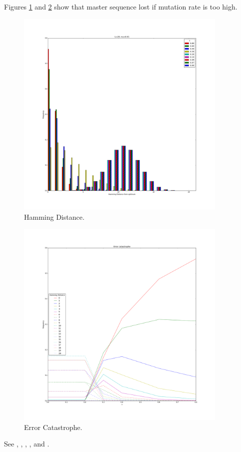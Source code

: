 \documentclass[]{article}
\begin{document}
Figures \ref{fig:ErrorCatastrophe1} and \ref{fig:ErrorCatastrophe2} show that master sequence lost if mutation rate is too high. 
\begin{figure}[H]
	\caption{Hamming Distance.}\label{fig:ErrorCatastrophe1} 
	\includegraphics[width=0.9\textwidth]{ErrorCatastrophe1}
\end{figure}
\begin{figure}[H]
	\caption{Error Catastrophe.}\label{fig:ErrorCatastrophe2} 
	\includegraphics[width=0.9\textwidth]{ErrorCatastrophe2}
\end{figure}


See \cite{eigen1978hypercycle}, \cite{eigen1988molecular}, \cite{eigen2002error}, \cite{crotty2001rna}, and \cite{stadtler2002fitness_landscapes}.



\printglossaries

 


\end{document}
